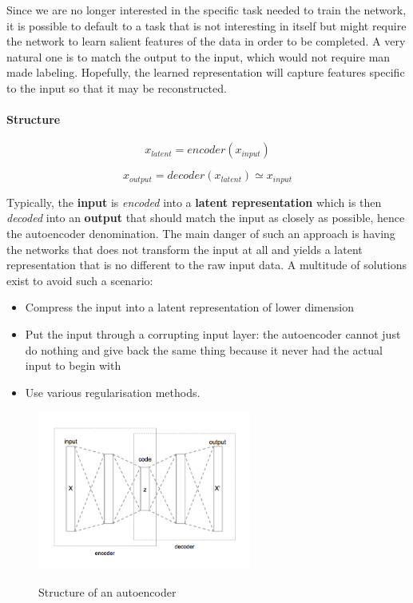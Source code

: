 \documentclass[conference]{IEEEtran}
\begin{document}
Since we are no longer interested in the specific task needed to train the
network, it is possible to default to a task that is not interesting in itself
but might require the network to learn salient features of the data in order to
be completed. A very natural one is to match the output to the input, which
would not require man made labeling. Hopefully, the learned representation will
capture features specific to the input so that it may be reconstructed.

\paragraph{Structure}


\begin{equation}
  x_{latent} = encoder(x_{input})
\end{equation}

\begin{equation}
  x_{output} = decoder(x_{latent}) \simeq x_{input}
\end{equation}

Typically, the \textbf{input} is \textit{encoded} into a \textbf{latent
  representation} which is then \textit{decoded} into an \textbf{output} that
should match the input as closely as possible, hence the autoencoder
denomination. The main danger of such an approach is having the networks that
does not transform the input at all and yields a latent representation that is
no different to the raw input data. A multitude of solutions exist to avoid such
a scenario:
\begin{itemize}
\item Compress the input into a latent representation of lower dimension
\item Put the input through a corrupting input layer: the autoencoder cannot
  just do nothing and give back the same thing because it never had the actual
  input to begin with
\item Use various regularisation methods.
\end{itemize}

\begin{figure}[!h]
    \centering
    \caption{Structure of an autoencoder}
    \includegraphics[width=7cm]{Autoencoder_structure.png}
    \label{autoencoder_structure}
\end{figure}
\end{document}
